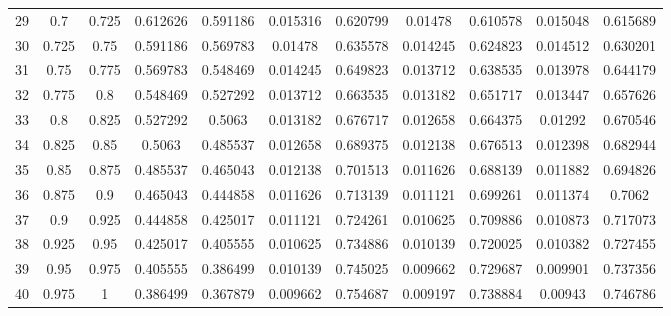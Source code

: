 \documentclass[11pt]{article}
\begin{document}
\begin{table}[H]
{\begin{tabular}{c c c c c c c c c c c}
                29 & 0.7 & 0.725 & 0.612626 & 0.591186 & 0.015316 & 0.620799 & 0.01478 & 0.610578 & 0.015048 & 0.615689 \\
                30 & 0.725 & 0.75 & 0.591186 & 0.569783 & 0.01478 & 0.635578 & 0.014245 & 0.624823 & 0.014512 & 0.630201 \\
                31 & 0.75 & 0.775 & 0.569783 & 0.548469 & 0.014245 & 0.649823 & 0.013712 & 0.638535 & 0.013978 & 0.644179 \\
                32 & 0.775 & 0.8 & 0.548469 & 0.527292 & 0.013712 & 0.663535 & 0.013182 & 0.651717 & 0.013447 & 0.657626 \\
                33 & 0.8 & 0.825 & 0.527292 & 0.5063 & 0.013182 & 0.676717 & 0.012658 & 0.664375 & 0.01292 & 0.670546 \\
                34 & 0.825 & 0.85 & 0.5063 & 0.485537 & 0.012658 & 0.689375 & 0.012138 & 0.676513 & 0.012398 & 0.682944 \\
                35 & 0.85 & 0.875 & 0.485537 & 0.465043 & 0.012138 & 0.701513 & 0.011626 & 0.688139 & 0.011882 & 0.694826 \\
                36 & 0.875 & 0.9 & 0.465043 & 0.444858 & 0.011626 & 0.713139 & 0.011121 & 0.699261 & 0.011374 & 0.7062 \\
                37 & 0.9 & 0.925 & 0.444858 & 0.425017 & 0.011121 & 0.724261 & 0.010625 & 0.709886 & 0.010873 & 0.717073 \\
                38 & 0.925 & 0.95 & 0.425017 & 0.405555 & 0.010625 & 0.734886 & 0.010139 & 0.720025 & 0.010382 & 0.727455 \\
                39 & 0.95 & 0.975 & 0.405555 & 0.386499 & 0.010139 & 0.745025 & 0.009662 & 0.729687 & 0.009901 & 0.737356 \\
                40 & 0.975 & 1 & 0.386499 & 0.367879 & 0.009662 & 0.754687 & 0.009197 & 0.738884 & 0.00943 & 0.746786 \\
                \bottomrule
            \end{tabular}
        }
    \end{table}
\end{document}
